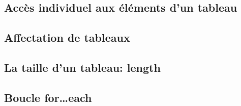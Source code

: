 \subsection{Accès individuel aux éléments d'un tableau}\label{subsec:acces-individuel-aux-elements-dun-tableau}
\subsection{Affectation de tableaux}\label{subsec:affectation-de-tableaux}
\subsection{La taille d'un tableau: length}\label{subsec:la-taille-dun-tableau}
\subsection{Boucle for\ldots each}\label{subsec:boucle-foreach}